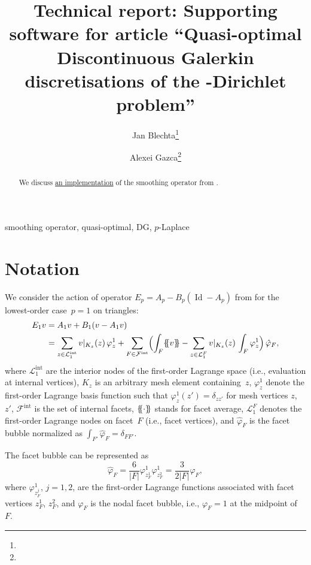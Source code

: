 \documentclass[oneeqnum]{siamart220329}
\title{%
  Technical report: Supporting software for article
  ``Quasi-optimal Discontinuous Galerkin discretisations of the \mathp-Dirichlet problem''
}
\author{%
    Jan Blechta\thanks{\email{blechta@karlin.mff.cuni.cz}}
    \and
    Alexei Gazca\thanks{\email{alexei.gazca@mathematik.uni-freiburg.de}}
}
\newcommand*{\ldblbrace}{\{\mskip-5mu\{}
\newcommand*{\rdblbrace}{\}\mskip-5mu\}}
\begin{document}
\maketitle


\begin{abstract}
  We discuss \href{https://github.com/blechta/quasioptimal-dg-p-laplace}{an
  implementation} of the smoothing operator from
  \cite{veeser-zanotti-ii,veeser-zanotti-iii}.
\end{abstract}


\begin{keywords}
  smoothing operator, quasi-optimal, DG, $p$-Laplace
\end{keywords}




\tableofcontents


\section{Notation}
%
We consider the action of operator $E_p = A_p - B_p(\operatorname{Id}{}-A_p)$ from
\cite{veeser-zanotti-ii,veeser-zanotti-iii} for the lowest-order case~$p=1$
on triangles:
%
\begin{align*}
  E_1 v
  & = A_1 v + B_1 (v - A_1 v) \\
  & = \sum_{z\in\mathcal{L}^{\mathrm{int}}_1} v|_{K_z}(z) \, \varphi^1_z
    + \sum_{F\in \mathcal{F}^{\mathrm{int}}} \Bigl( \int_F \ldblbrace v
        \rdblbrace - \sum_{z\in\mathcal{L}^F_1} v|_{K_z}(z) \, \int_F \varphi_z^1
        \Bigr) \, \hat\varphi_F,
\end{align*}
%
where $\mathcal{L}^{\mathrm{int}}_1$ are the interior nodes of the first-order
Lagrange space (i.e., evaluation at internal vertices),
$K_z$ is an arbitrary mesh element containing~$z$,
$\varphi^1_z$ denote the first-order Lagrange basis function such that $\varphi^1_z(z')=\delta_{zz'}$ for mesh vertices $z$, $z'$,
$\mathcal{F}^{\mathrm{int}}$ is the set of internal facets,
$\ldblbrace\cdot\rdblbrace$ stands for facet average,
$\mathcal{L}^F_1$ denotes the first-order Lagrange nodes on facet~$F$ (i.e., facet vertices),
and
$\hat\varphi_F$ is the facet bubble normalized as $\int_{F'} \hat\varphi_F = \delta_{FF'}$.

The facet bubble can be represented as
%
\begin{equation}
  \label{eq:facet_bubbles}
  \hat\varphi_F
  = \frac{6}{|F|} \varphi^1_{z_F^1} \varphi^1_{z_F^2}
  = \frac{3}{2|F|} \varphi_F,
\end{equation}
%
where $\varphi^1_{z_F^j}$, $j=1,2$, are the first-order Lagrange functions
associated with facet vertices $z_F^1$, $z_F^2$, and $\varphi_F$ is the nodal
facet bubble, i.e., $\varphi_F=1$ at the midpoint of~$F$.
\end{document}
